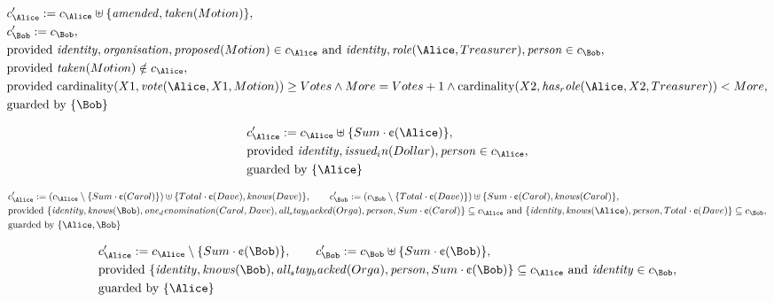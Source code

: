 \begin{align*}
&
c'_
{
\Alice
}
 := 
c_
{
\Alice
}
 \uplus 
\{
\mathit{
amended
}
,
\mathit{
taken
}
(
Motion
)
\}
,\\
&
c'_
{
\Bob
}
 := 
c_
{
\Bob
}
,\\
&
\text{provided } 
\mathit{
identity
}
,
\mathit{
organisation
}
,
\mathit{
proposed
}
(
Motion
)
 \in c_
{
\Alice
}
 \text{ and } 
\mathit{
identity
}
,
\mathit{
role
}
(
\Alice
,
Treasurer
)
,
\mathit{
person
}
 \in c_
{
\Bob
}
,\\
&
\text{provided } 
\mathit{
taken
}
(
Motion
)
 \notin c_
{
\Alice
}
,\\
&
\text{provided } 
\mathrm{cardinality}(
X1
,
\mathit{
vote
}
(
\Alice
,
X1
,
Motion
)
)
\ge
Votes
\land
More
=
Votes
+
1
\land
\mathrm{cardinality}(
X2
,
\mathit{
has_role
}
(
\Alice
,
X2
,
Treasurer
)
)
<
More
,\\
&
\text{guarded by } \{
\Bob
\}
\end{align*}

\begin{align*}
&
c'_
{
\Alice
}
 := 
c_
{
\Alice
}
 \uplus 
\{
Sum
\cdot
\text{\textcent}
(
\Alice
)
\}
,\\
&
\text{provided } 
\mathit{
identity
}
,
\mathit{
issued_in
}
(
Dollar
)
,
\mathit{
person
}
 \in c_
{
\Alice
}
,\\
&
\text{guarded by } \{
\Alice
\}
\end{align*}

\begin{align*}
&
c'_
{
\Alice
}
 := 
(c_
{
\Alice
}
 \setminus 
\{
Sum
\cdot
\text{\textcent}
(
Carol
)
\}
) \uplus 
\{
Total
\cdot
\text{\textcent}
(
Dave
)
,
\mathit{
knows
}
(
Dave
)
\}
, \qquad 
c'_
{
\Bob
}
 := 
(c_
{
\Bob
}
 \setminus 
\{
Total
\cdot
\text{\textcent}
(
Dave
)
\}
) \uplus 
\{
Sum
\cdot
\text{\textcent}
(
Carol
)
,
\mathit{
knows
}
(
Carol
)
\}
,\\
&
\text{provided } 
\{
\mathit{
identity
}
,
\mathit{
knows
}
(
\Bob
)
,
\mathit{
one_denomination
}
(
Carol
,
Dave
)
,
\mathit{
all_stay_backed
}
(
Orga
)
,
\mathit{
person
}
,
Sum
\cdot
\text{\textcent}
(
Carol
)
\}
 \subseteq c_
{
\Alice
}
 \text{ and } 
\{
\mathit{
identity
}
,
\mathit{
knows
}
(
\Alice
)
,
\mathit{
person
}
,
Total
\cdot
\text{\textcent}
(
Dave
)
\}
 \subseteq c_
{
\Bob
}
,\\
&
\text{guarded by } \{
\Alice
,
\Bob
\}
\end{align*}

\begin{align*}
&
c'_
{
\Alice
}
 := 
c_
{
\Alice
}
 \setminus 
\{
Sum
\cdot
\text{\textcent}
(
\Bob
)
\}
, \qquad 
c'_
{
\Bob
}
 := 
c_
{
\Bob
}
 \uplus 
\{
Sum
\cdot
\text{\textcent}
(
\Bob
)
\}
,\\
&
\text{provided } 
\{
\mathit{
identity
}
,
\mathit{
knows
}
(
\Bob
)
,
\mathit{
all_stay_backed
}
(
Orga
)
,
\mathit{
person
}
,
Sum
\cdot
\text{\textcent}
(
\Bob
)
\}
 \subseteq c_
{
\Alice
}
 \text{ and } 
\mathit{
identity
}
 \in c_
{
\Bob
}
,\\
&
\text{guarded by } \{
\Alice
\}
\end{align*}
